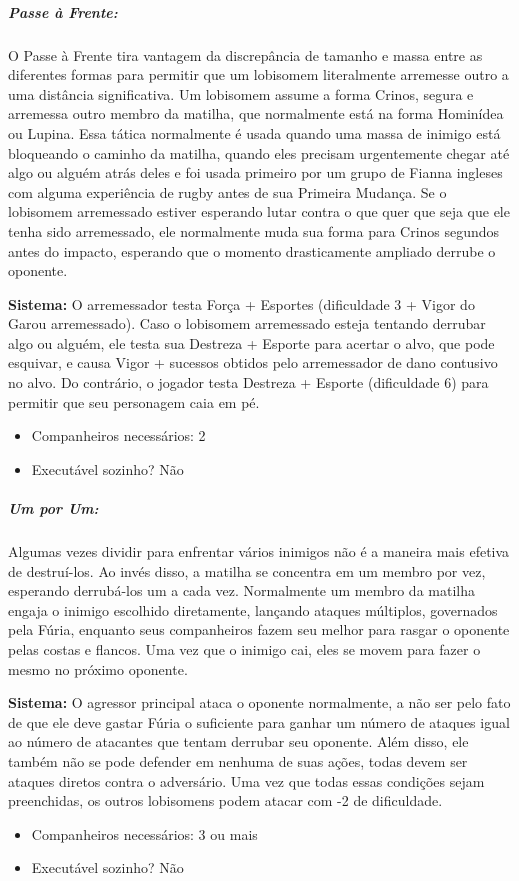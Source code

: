 \begin{multicols}{2}
\subparagraph{\textbf{Passe à Frente:}}
O Passe à Frente tira vantagem da discrepância de tamanho e massa entre as diferentes formas para permitir que um lobisomem literalmente arremesse outro a uma distância significativa. Um lobisomem assume a forma Crinos, segura e arremessa outro membro da matilha, que normalmente está na forma Hominídea ou Lupina. Essa tática normalmente é usada quando uma massa de inimigo está bloqueando o caminho da matilha, quando eles precisam urgentemente chegar até algo ou alguém atrás deles e foi usada primeiro por um grupo de Fianna ingleses com alguma experiência de rugby antes de sua Primeira Mudança. Se o lobisomem arremessado estiver esperando lutar contra o que quer que seja que ele tenha sido arremessado, ele normalmente muda sua forma para Crinos segundos antes do impacto, esperando que o momento drasticamente ampliado derrube o oponente.

\textbf{Sistema:} O arremessador testa Força + Esportes (dificuldade 3 + Vigor do Garou arremessado). Caso o lobisomem arremessado esteja tentando derrubar algo ou alguém, ele testa sua Destreza + Esporte para acertar o alvo, que pode esquivar, e causa Vigor + sucessos obtidos pelo arremessador de dano contusivo no alvo. Do contrário, o jogador testa Destreza + Esporte (dificuldade 6) para permitir que seu personagem caia em pé.
\begin{itemize}[noitemsep]
\item Companheiros necessários: 2 
\item Executável sozinho? Não
\end{itemize}

\subparagraph{\textbf{Um por Um:}}
Algumas vezes dividir para enfrentar vários inimigos não é a maneira mais efetiva de destruí-los. Ao invés disso, a matilha se concentra em um membro por vez, esperando derrubá-los um a cada vez. Normalmente um membro da matilha engaja o inimigo escolhido diretamente, lançando ataques múltiplos, governados pela Fúria, enquanto seus companheiros fazem seu melhor para rasgar o oponente pelas costas e flancos. Uma vez que o inimigo cai, eles se movem para fazer o mesmo no próximo oponente. 

\textbf{Sistema:} O agressor principal ataca o oponente normalmente, a não ser pelo fato de que ele deve gastar Fúria o suficiente para ganhar um número de ataques igual ao número de atacantes que tentam derrubar seu oponente. Além disso, ele também não se pode defender em nenhuma de suas ações, todas devem ser ataques diretos contra o adversário. Uma vez que todas essas condições sejam preenchidas, os outros lobisomens podem atacar com -2 de dificuldade. 
\begin{itemize}[noitemsep]
\item Companheiros necessários: 3 ou mais
\item Executável sozinho? Não
\end{itemize}


\end{multicols}

